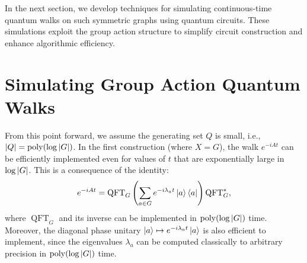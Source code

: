 \documentclass[12pt]{report}
\begin{document}



In the next section, we develop techniques for simulating continuous-time quantum walks on such symmetric graphs using quantum circuits. These simulations exploit the group action structure to simplify circuit construction and enhance algorithmic efficiency.




\chapter{Simulating Group Action Quantum Walks}



From this point forward, we assume the generating set \( Q \) is small, i.e., \( \abs{Q} = \operatorname{poly}(\log \abs{G}) \). In the first construction (where \( X = G \)), the walk \( e^{-iAt} \) can be efficiently implemented even for values of \( t \) that are exponentially large in \( \log \abs{G} \). This is a consequence of the identity:
\begin{equation}
    \label{eq:adjmat-fb}
    e^{-iAt} = \operatorname{QFT}_G \left( \sum_{a \in G} e^{-i\lambda_a t} \ket{a} \bra{a} \right) \operatorname{QFT}_G^*,
\end{equation}
where \( \operatorname{QFT}_G \) and its inverse can be implemented in \( \operatorname{poly}(\log \abs{G}) \) time. Moreover, the diagonal phase unitary \( \ket{a} \mapsto e^{-i\lambda_a t} \ket{a} \) is also efficient to implement, since the eigenvalues \( \lambda_a \) can be computed classically to arbitrary precision in \( \operatorname{poly}(\log \abs{G}) \) time.
\end{document}
